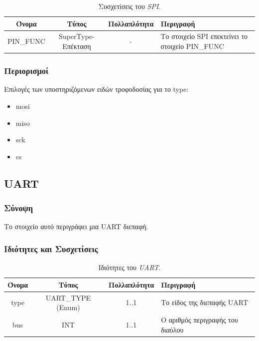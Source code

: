 \begin{table}[H]
	\begin{center}
		\caption{Συσχετίσεις του \textit{SPI}.}
		\label{tab:spi2}
		\begin{tabular}{ | c | c | c| m{5.5cm} | }
			\hline
			\rowcolor{Gray}
			Όνομα & Τύπος & Πολλαπλότητα & Περιγραφή \\
			\hline
			PIN\_FUNC & SuperType-Επέκταση & - &  Το στοιχείο SPI επεκτείνει το στοιχείο PIN\_FUNC \\
			\hline
		\end{tabular}
	\end{center}
\end{table}

\subsubsection*{Περιορισμοί}

\noindent Επιλογές των υποστηριζόμενων ειδών τροφοδοσίας για το type:

\begin{itemize}
	\item mosi
	\item miso
	\item sck
	\item cs
\end{itemize}

\subsection{UART}
\label{subsec:uart}

\subsubsection*{Σύνοψη}

\noindent Το στοιχείο αυτό περιγράφει μια UART διεπαφή.

\subsubsection*{Ιδιότητες και Συσχετίσεις}

\begin{table}[H]
	\begin{center}
		\caption{Ιδιότητες του \textit{UART}.}
		\label{tab:uart1}
		\begin{tabular}{ | c | c | c| m{5.5cm} | }
			\hline
			\rowcolor{Gray}
			Όνομα & Τύπος & Πολλαπλότητα & Περιγραφή \\
			\hline
			type & UART\_TYPE (Enum) & 1..1 & Το είδος της διεπαφής UART \\
			\hline
			bus & INT & 1..1 & Ο αριθμός περιγραφής του διαύλου \\
			\hline
		\end{tabular}
	\end{center}
\end{table}

